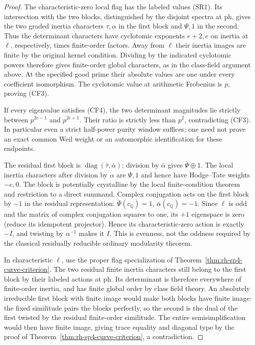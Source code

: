 \begin{proof}
The characteristic-zero local flag has the
labeled values (SR1). Its intersection with the
two blocks, distinguished by the disjoint
spectra at \(\mathrm{ph}\), gives the two
graded inertia characters \(\tau,\alpha\)
in the first block and \(\Psi,1\) in the
second. Thus the determinant characters
have cyclotomic exponents \(e+2,e\) on
inertia at \(\ell\), respectively, times
finite-order factors.
Away from \(\ell\) their inertia images are finite
by the original kernel condition.
Dividing by the indicated cyclotomic powers
therefore gives finite-order global characters,
as in the class-field argument above.
At the specified good prime their absolute
values are one under every coefficient
isomorphism. The cyclotomic value at
arithmetic Frobenius is \(p\), proving (CF3).

If every eigenvalue satisfies (CF4), the two
determinant magnitudes lie strictly between
\(p^{2c-1}\) and \(p^{2c+1}\).
Their ratio is strictly less than \(p^2\),
contradicting (CF3). In particular even a
strict half-power purity window suffices;
one need not prove an exact common Weil weight
or an automorphic identification for these
endpoints.

The residual first block is
\(\operatorname{diag}(\bar\tau,\bar\alpha)\);
division by \(\bar\alpha\) gives
\(\bar\Psi\oplus1\). The local inertia
characters after division by \(\alpha\)
are \(\Psi,1\) and hence have Hodge--Tate
weights \(-e,0\).
The block is potentially crystalline by the
local finite-condition theorem and restriction
to a direct summand.
Complex conjugation acts on the first block
by \(-1\) in the residual representation:
\(\bar\Psi(c_{\mathbb Q})=1\),
\(\bar\alpha(c_{\mathbb Q})=-1\).
Since \(\ell\) is odd and the matrix of complex
conjugation squares to one, its \(+1\)
eigenspace is zero (reduce its idempotent
projector). Hence its characteristic-zero
action is exactly \(-I\), and twisting by
\(\alpha^{-1}\) makes it \(I\).
This is evenness, not the oddness required
by the classical residually reducible ordinary
modularity theorem.

In characteristic \(\ell\), use the proper
flag specialization of
Theorem~\ref{thm:rh-sp4-curve-criterion}.
The two residual finite inertia characters
still belong to the first block by their
labeled actions at \(\mathrm{ph}\).
Its determinant is therefore everywhere of
finite-order inertia, and has finite global
order by class field theory.
An absolutely irreducible first block with
finite image would make both blocks have
finite image: the fixed similitude pairs the
blocks perfectly, so the second is the
dual of the first twisted by the residual
finite-order similitude.
The entire semisimplification would then have
finite image, giving trace equality and
diagonal type by the proof of
Theorem~\ref{thm:rh-sp4-curve-criterion},
a contradiction.
\end{proof}

